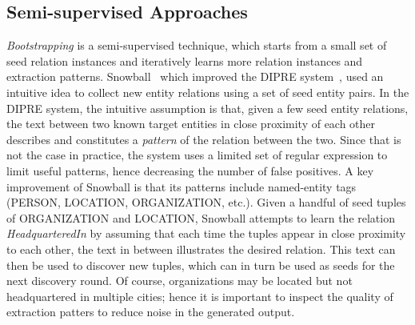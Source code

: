 \subsection{Semi-supervised Approaches}
\textit{Bootstrapping} is a semi-supervised technique, which starts from a small set of seed relation instances and iteratively learns more relation instances and extraction patterns.
Snowball~\cite{agichtein2000snowball} which improved the DIPRE system~\cite{brin1998extracting}, used an intuitive idea to collect new entity relations using a set of seed entity pairs.
In the DIPRE system, the intuitive assumption is that, given a few seed entity relations, the text between two known target entities in close proximity of each other describes and constitutes a \textit{pattern} of the relation between the two. 
Since that is not the case in practice, the system uses a limited set of regular expression to limit useful patterns, hence decreasing the number of false positives.
A key improvement of Snowball
is that its patterns include named-entity tags (PERSON, LOCATION, ORGANIZATION, etc.).
Given a handful of seed tuples of ORGANIZATION and LOCATION, Snowball attempts to learn the relation \textit{HeadquarteredIn} by assuming that each time the tuples appear in close proximity to each other, 
the text in between illustrates the desired relation.
This text can then be used to discover new tuples, which can in turn be used as seeds for the next discovery round.
Of course, organizations may be located but not headquartered in multiple cities;
hence it is important to inspect the quality of extraction patters to reduce noise in the generated output.

